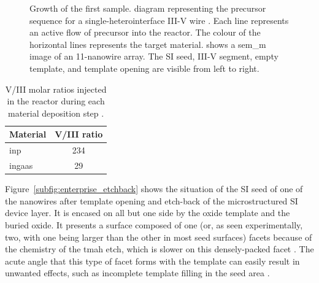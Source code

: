 \begin{figure}
{
    }
    \caption[Precursor sequence and \acs{sem_m} image of sample 1.]{Growth of the first sample.  diagram representing the precursor sequence for a single-heterointerface III-V wire \cite{Brugnolotto2023}. Each line represents an active flow of precursor into the reactor. The colour of the horizontal lines represents the target material.  shows a \acs{sem_m} image of an \num{11}-nanowire array. The \acs{SI} seed, III-V segment, empty template, and template opening are visible from left to right.}
    \label{fig:sample1_growth}
\end{figure}

\begin{table}
    \centering
    \caption[V/III molar ratios injected in the reactor during each material deposition step.]{V/III molar ratios injected in the reactor during each material deposition step \cite{Brugnolotto2023_2}.}
    \begin{tabular}{l|c}
        Material & V/III ratio \\ \hline \hline
        \acs{inp}  & 234\\
        \acs{ingaas}     & 29\\ \hline
    \end{tabular}
    \label{tab:sample1_ratios}
\end{table}

Figure~\ref{subfig:enterprise_etchback} shows the situation of the \acl{SI} seed of one of the nanowires after template opening and etch-back of the microstructured \acl{SI} device layer. It is encased on all but one side by the oxide template and the buried oxide. It presents a surface composed of one (or, as seen experimentally, two, with one being larger than the other in most seed surfaces)  facets because of the chemistry of the \acs{tmah} etch, which is slower on this densely-packed facet \cite{Zubel2012}. The acute angle that this type of facet forms with the template can easily result in unwanted effects, such as incomplete template filling in the seed area \cite{Scherrer2022}. 

